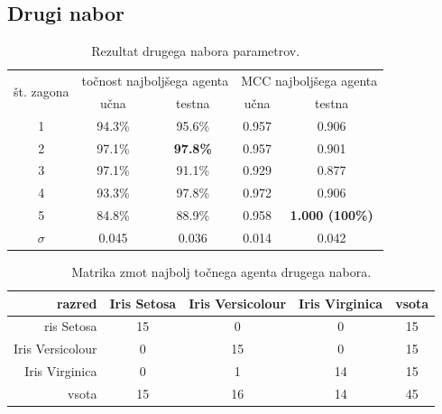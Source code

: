 \subsection{Drugi nabor}\label{subsec:dodatek-iris-drugi-nabor}
\begin{table}[H]
    \begin{center}
        \begin{tabular}{|| c | c c || c c ||}
            \hline
            \multirow{2}{*}{št. zagona} & \multicolumn{2}{c||}{točnost najboljšega agenta} & \multicolumn{2}{c||}{MCC najboljšega agenta} \\ \cline{2-5}
            & učna    & testna           & učna  & testna         \\
            \hline
            1        & 94.3\% & 95.6\%          & 0.957 & 0.906          \\
            \hline
            2        & 97.1\% & \textbf{97.8\%} & 0.957 & 0.901          \\
            \hline
            3        & 97.1\% & 91.1\%          & 0.929 & 0.877          \\
            \hline
            4        & 93.3\% & 97.8\%          & 0.972 & 0.906          \\
            \hline
            5        & 84.8\% & 88.9\%          & 0.958 & \textbf{1.000 (100\%)} \\
            \hline
            $\sigma$ & 0.045   & 0.036            & 0.014 & 0.042          \\
            \hline
        \end{tabular}
    \end{center}
    \caption{Rezultat drugega nabora parametrov.}
    \label{tab:iris_result_2}
\end{table}

\begin{table}[H]
    \centering
    \begin{tabular}{||rcccc||}
        \hline
        razred           & Iris Setosa & Iris Versicolour & Iris Virginica & vsota \\ \hline
        ris Setosa       & 15          & 0                & 0              & 15    \\ \hline
        Iris Versicolour & 0           & 15               & 0              & 15    \\ \hline
        Iris Virginica   & 0           & 1                & 14             & 15    \\ \hline
        vsota            & 15          & 16               & 14             & 45    \\ \hline
    \end{tabular}
    \caption{Matrika zmot najbolj točnega agenta drugega nabora.}
    \label{tab:iris_acc_2}
\end{table}

